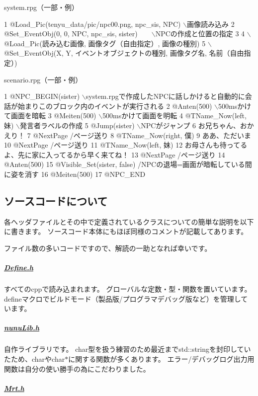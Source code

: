 system.\+rpg（一部・例） 
\begin{DoxyCode}
1 @Load\_Pic(tenyu\_data/pic/npc00.png, npc\_sis, NPC)  \(\backslash\)画像読み込み
2 @Set\_EventObj(0, 0, NPC, npc\_sis, sister)　　\(\backslash\)NPCの作成と位置の指定
3 
4 \(\backslash\)@Load\_Pic(読み込む画像, 画像タグ（自由指定）, 画像の種別)
5 \(\backslash\)@Set\_EventObj(X, Y, イベントオブジェクトの種別, 画像タグ名, 名前（自由指定）)
\end{DoxyCode}
 scenario.\+rpg（一部・例） 
\begin{DoxyCode}
1 @NPC\_BEGIN(sister)  \(\backslash\)system.rpgで作成したNPCに話しかけると自動的に会話が始まりこのブロック内のイベントが実行される
2   @Anten(500)  \(\backslash\)500msかけて画面を暗転
3   @Meiten(500)  \(\backslash\)500msかけて画面を明転
4   @TName\_Now(left, 妹)  \(\backslash\)発言者ラベルの作成
5   @Jump(sister)  \(\backslash\)NPCがジャンプ
6   お兄ちゃん、おかえり！
7   @NextPage  /ページ送り
8   @TName\_Now(right, 僕)
9   ああ、ただいま
10   @NextPage  /ページ送り
11   @TName\_Now(left, 妹)
12   お母さんも待ってるよ、先に家に入ってるから早く来てね！
13   @NextPage  /ページ送り
14   @Anten(500)
15   @Visible\_Set(sister, false)  /NPCの退場=画面が暗転している間に姿を消す
16   @Meiten(500)  
17 @NPC\_END
\end{DoxyCode}


\subsection*{ソースコードについて}

各ヘッダファイルとその中で定義されているクラスについての簡単な説明を以下に書きます。 ソースコード本体にもほぼ同様のコメントが記載してあります。

ファイル数の多いコードですので、解読の一助となれば幸いです。 



\subparagraph*{\hyperlink{_define_8h_source}{Define.\+h}}

すべてのcppで読み込まれます。 グローバルな定数・型・関数を置いています。 defineマクロでビルドモード（製品版/プログラマデバッグ版など）を管理しています。

\subparagraph*{\hyperlink{nunu_lib_8h_source}{nunu\+Lib.\+h}}

自作ライブラリです。 char型を扱う練習のため最近までstd\+::stringを封印していたため、charやchar$\ast$に関する関数が多くあります。 エラー/デバッグログ出力用関数は自分の使い勝手の為にこだわりました。

\subparagraph*{\hyperlink{_mrt_8h_source}{Mrt.\+h}}

